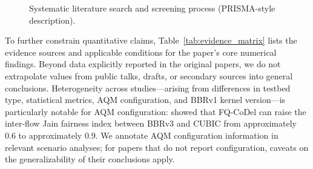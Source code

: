 \documentclass[a4paper,fleqn]{cas-sc}
\begin{document}
\begin{figure}[pos=tbp]
\caption{Systematic literature search and screening process (PRISMA-style description).}
\label{fig:prisma}
\end{figure}

To further constrain quantitative claims, Table~\ref{tab:evidence_matrix} lists
the evidence sources and applicable conditions for the paper's core numerical
findings. Beyond data explicitly reported in the original papers, we do not
extrapolate values from public talks, drafts, or secondary sources into general
conclusions. Heterogeneity across studies---arising from differences in testbed
type, statistical metrics, AQM configuration, and BBRv1 kernel version---is
particularly notable for AQM configuration: \citet{pokhrel2025wifi} showed that
FQ-CoDel can raise the inter-flow Jain fairness index between BBRv3 and CUBIC
from approximately 0.6 to approximately 0.9. We annotate AQM configuration
information in relevant scenario analyses; for papers that do not report
configuration, caveats on the generalizability of their conclusions apply.
\end{document}
